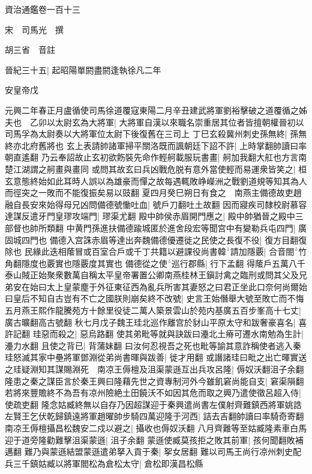 資治通鑑卷一百十三


宋　司馬光　撰

胡三省　音註

晉紀三十五|{
	起昭陽單閼盡閼逢執徐凡二年}


安皇帝戊

元興二年春正月盧循使司馬徐道覆寇東陽二月辛丑建武將軍劉裕擊破之道覆循之姊夫也　乙卯以太尉玄為大將軍|{
	大將軍自漢以來職名崇重居其位者皆擅朝權晉初以司馬孚為太尉奏以大將軍位太尉下後復舊在三司上}
丁巳玄殺冀州刺史孫無終|{
	孫無終亦北府舊將也}
玄上表請帥諸軍掃平關洛既而諷朝廷下詔不許|{
	上時掌翻帥讀曰率朝直遙翻}
乃云奉詔故止玄初欲飭裝先命作輕舸載服玩書畫|{
	舸加我翻大舡也方言南楚江湖謂之舸畫與畫同}
或問其故玄曰兵凶戰危脱有意外當使輕而易運衆皆笑之|{
	桓玄意態終始如此耳時人誤以為雄豪而憚之故每遇輒敗峥嶸洲之戰劉道規等知其為人而徑突之一敗而不能復振矣易以豉翻}
夏四月癸巳朔日有食之　南燕主備德故吏趙融自長安來始得母兄凶問備德號慟吐血|{
	號戶刀翻吐土故翻}
因而寢疾司隸校尉慕容達謀反遣牙門皇璆攻端門|{
	璆渠尤翻}
殿中帥侯赤眉開門應之|{
	殿中帥猶晉之殿中三部督也帥所類翻}
中黄門孫進扶備德踰城匿於進舍段宏等聞宫中有變勒兵屯四門|{
	廣固城四門也}
備德入宫誅赤眉等達出奔魏備德優遷徙之民使之長復不役|{
	復方目翻復除也}
民緣此迭相䕃冒或百室合戶或千丁共籍以避課役尚書韓請加隱覈|{
	合音閤竹角翻隱度也覈實也隱覈度其實也}
備德從之使巡行郡縣|{
	行下孟翻}
得䕃戶五萬八千　泰山賊正始聚衆數萬自稱太平皇帝署置公卿南燕桂林王鎭討禽之臨刑或問其父及兄弟安在始曰太上皇蒙塵于外征東征西為亂兵所害其妻怒之曰君正坐此口奈何尚爾始曰皇后不知自古豈有不亡之國朕則崩矣終不改號|{
	史言王始僭舉大號至敗亡而不悔}
五月燕王熙作龍騰苑方十餘里役徒二萬人築景雲山於苑内基廣五百步峯高十七丈|{
	廣古曠翻高古號翻}
秋七月戊子魏王珪北巡作離宫於豺山平原太守和跋奢豪喜名|{
	喜許記翻}
珪惡而殺之|{
	惡烏路翻}
使其弟毗等就與訣跋曰灅北土瘠可遷水南勉為生計|{
	灅力水翻}
且使之背已|{
	背蒲妹翻}
曰汝何忍視吾之死也毗等諭其意詐稱使者逃入秦珪怒滅其家中壘將軍鄧淵從弟尚書暉與跋善|{
	徙才用翻}
或譖諸珪曰毗之出亡暉實送之珪疑淵知其謀賜淵死　南凉王傉檀及沮渠蒙遜互出兵攻呂隆|{
	傉奴沃翻沮子余翻}
隆患之秦之謀臣言於秦王興曰隆藉先世之資專制河外今雖飢窘尚能自支|{
	窘渠隕翻}
若將來豐贍終不為吾有凉州險絶土田饒沃不如因其危而取之興乃遣使徵呂超入侍|{
	使疏吏翻}
隆念姑臧終無以自存乃因超謀迎于秦興遣尚書左僕射齊難鎮西將軍姚誥左賢王乞伏乾歸鎮遠將軍趙曜帥步騎四萬迎隆于河西|{
	詰去吉翻帥讀曰率騎奇寄翻}
南凉王傉檀攝昌松魏安二戍以避之|{
	攝收也傉奴沃翻}
八月齊難等至姑臧隆素車白馬迎于道旁隆勸難擊沮渠蒙遜|{
	沮子余翻}
蒙遜使臧莫孩拒之敗其前軍|{
	孩何聞翻敗補邁翻}
難乃與蒙遜結盟蒙遜遣弟拏入貢于秦|{
	挐女居翻}
難以司馬王尚行凉州刺史配兵三千鎮姑臧以將軍閻松為倉松太守|{
	倉松即漢昌松縣}
